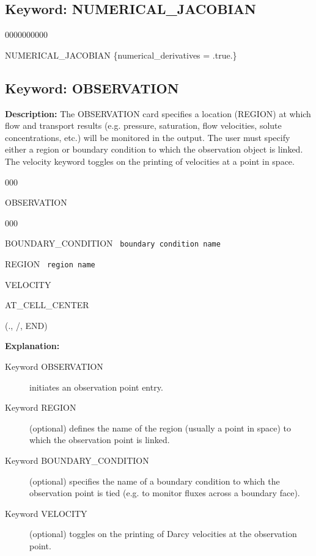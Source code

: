 \documentclass[12pt]{article}
\begin{document}



\newpage
\protect\hypertarget{target_numjac}{}

\subsection{Keyword: NUMERICAL\_JACOBIAN}
\begin{deflist}{0000000000}
\item[NUMERICAL\_JACOBIAN] \{numerical\_derivatives = .true.\}
\end{deflist}


\newpage
\protect\hypertarget{target_observation}{}

\subsection{Keyword: OBSERVATION}

{\noindent\bf Description:}
The OBSERVATION card specifies a location (REGION) at which flow and transport results (e.g. pressure, saturation, flow velocities, solute concentrations, etc.) will be monitored in the output.
The user must specify either a region or boundary condition to which the observation object is linked.  The velocity keyword toggles on the printing of velocities at a point in space.

\begin{deflist}{000}
\item[OBSERVATION] ~
\begin{deflist}{000}
\item[BOUNDARY\_CONDITION] \ {\tt boundary condition name}
\item[REGION] \ {\tt region name}
\item[VELOCITY]
\item[AT\_CELL\_CENTER]
\end{deflist}
\item[(., /, END)]
\end{deflist}

{\noindent\bf Explanation:}
\begin{description}
\item[Keyword OBSERVATION] initiates an observation point entry.
\item[Keyword REGION] (optional) defines the name of the region (usually a point in space) to which the observation point is linked.
\item[Keyword BOUNDARY\_CONDITION] (optional) specifies the name of a boundary condition to which the observation point is tied (e.g. to monitor fluxes across a boundary face).
\item[Keyword VELOCITY] (optional) toggles on the printing of Darcy velocities at the observation point.
\end{description}
\end{document}
